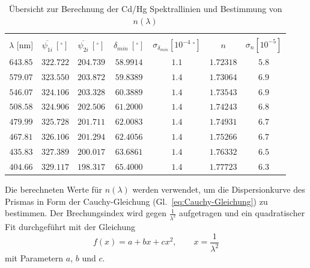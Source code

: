 \documentclass[12pt,a4paper]{article}
\begin{document}
\begin{table}
	\centering
	\begin{tabular}{|c|c|c|c|c|c|c|}
		\hline
		&&&&&&\\
		$\lambda$ [nm]&$\overline{\psi_{1i}}\ [^{\circ}]$&$\overline{\psi_{2i}}\ [^{\circ}]$&$\delta_{min}\ [^{\circ}]$&$\sigma_{\delta_{min}}[10^{-4}\ ^{\circ}]$& $n$ & $\sigma_{n}[10^{-5}]$\\
		\hline
		$643.85$&$322.722$&$204.739$&$58.9914$&$1.1$&$1.72318$&$5.8$\\
		$579.07$&$323.550$&$203.872$&$59.8389$&$1.4$&$1.73064$&$6.9$\\
		$546.07$&$324.106$&$203.328$&$60.3889$&$1.4$&$1.73543$&$6.9$\\
		$508.58$&$324.906$&$202.506$&$61.2000$&$1.4$&$1.74243$&$6.8$\\
		$479.99$&$325.728$&$201.711$&$62.0083$&$1.4$&$1.74931$&$6.7$\\
		$467.81$&$326.106$&$201.294$&$62.4056$&$1.4$&$1.75266$&$6.7$\\
		$435.83$&$327.389$&$200.017$&$63.6861$&$1.4$&$1.76332$&$6.5$\\
		$404.66$&$329.117$&$198.317$&$65.4000$&$1.4$&$1.77723$&$6.3$\\
		\hline
	\end{tabular}
	\caption{Übersicht zur Berechnung der Cd/Hg Spektrallinien und Bestimmung von $n(\lambda)$}
	\label{table:CdHg_Rechnung}
\end{table}{

Die berechneten Werte für $n(\lambda)$ werden verwendet, um die Dispersionkurve des Prismas in Form der Cauchy-Gleichung (Gl.~\eqref{eq:Cauchy-Gleichung}) zu bestimmen. Der Brechungsindex wird gegen $\frac{1}{\lambda^2}$ aufgetragen und ein quadratischer Fit durchgeführt mit der Gleichung
\begin{equation}
f(x)=a+bx+cx^2,\qquad x=\frac{1}{\lambda^2}
\end{equation}
mit Parametern $a$, $b$ und $c$.


}
\end{document}
